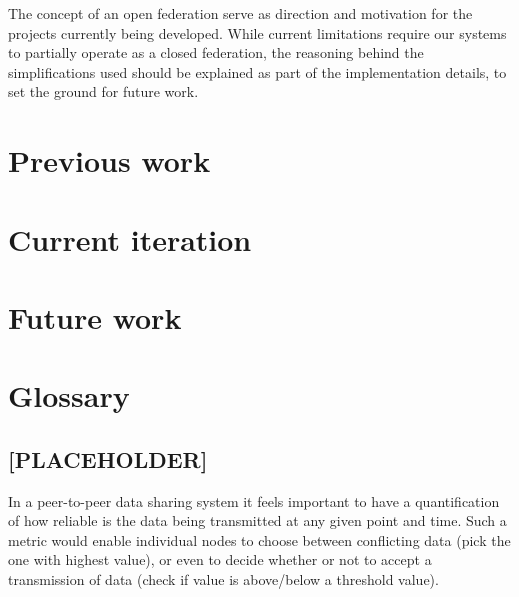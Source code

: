 \documentclass[journal]{IEEEtran}
\begin{document}
The concept of an open federation serve as direction and motivation for the projects currently being developed. While current limitations require our systems to partially operate as a closed federation, the reasoning behind the simplifications used should be explained as part of the implementation details, to set the ground for future work.

\section{Previous work} \label{sect:PREV_WORK}

\section{Current iteration}

\section{Future work}

\section{Glossary}

\subsection{[PLACEHOLDER]}
	In a peer-to-peer data sharing system it feels important to have a quantification of how reliable is the data being transmitted at any given point and time. Such a metric would enable individual nodes to choose between conflicting data (pick the one with highest value), or even to decide whether or not to accept a transmission of data (check if value is above/below a threshold value). 





	
\end{document}
